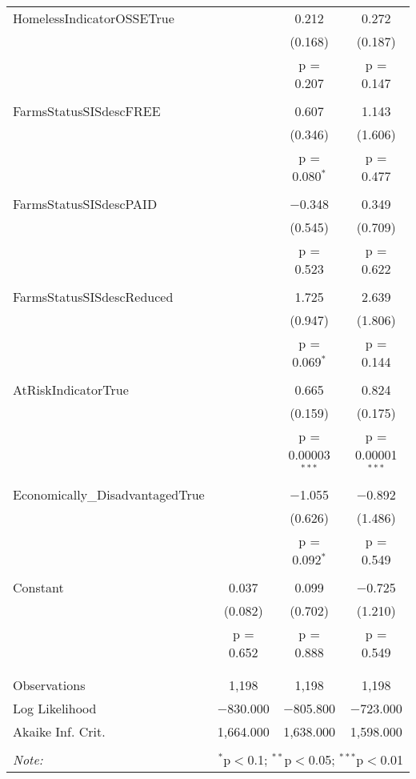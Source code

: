 \begin{table}[!htbp]
\begin{tabular}{@{\extracolsep{5pt}}lccc}
 HomelessIndicatorOSSETrue &  & 0.212 & 0.272 \\ 
  &  & (0.168) & (0.187) \\ 
  &  & p = 0.207 & p = 0.147 \\ 
  & & & \\ 
 FarmsStatusSISdescFREE &  & 0.607 & 1.143 \\ 
  &  & (0.346) & (1.606) \\ 
  &  & p = 0.080$^{*}$ & p = 0.477 \\ 
  & & & \\ 
 FarmsStatusSISdescPAID &  & $-$0.348 & 0.349 \\ 
  &  & (0.545) & (0.709) \\ 
  &  & p = 0.523 & p = 0.622 \\ 
  & & & \\ 
 FarmsStatusSISdescReduced &  & 1.725 & 2.639 \\ 
  &  & (0.947) & (1.806) \\ 
  &  & p = 0.069$^{*}$ & p = 0.144 \\ 
  & & & \\ 
 AtRiskIndicatorTrue &  & 0.665 & 0.824 \\ 
  &  & (0.159) & (0.175) \\ 
  &  & p = 0.00003$^{***}$ & p = 0.00001$^{***}$ \\ 
  & & & \\ 
 Economically\_DisadvantagedTrue &  & $-$1.055 & $-$0.892 \\ 
  &  & (0.626) & (1.486) \\ 
  &  & p = 0.092$^{*}$ & p = 0.549 \\ 
  & & & \\ 
 Constant & 0.037 & 0.099 & $-$0.725 \\ 
  & (0.082) & (0.702) & (1.210) \\ 
  & p = 0.652 & p = 0.888 & p = 0.549 \\ 
  & & & \\ 
\hline \\[-1.8ex] 
Observations & 1,198 & 1,198 & 1,198 \\ 
Log Likelihood & $-$830.000 & $-$805.800 & $-$723.000 \\ 
Akaike Inf. Crit. & 1,664.000 & 1,638.000 & 1,598.000 \\ 
\hline 
\hline \\[-1.8ex] 
\textit{Note:}  & \multicolumn{3}{r}{$^{*}$p$<$0.1; $^{**}$p$<$0.05; $^{***}$p$<$0.01} \\ 
\end{tabular} 
\end{table} 
